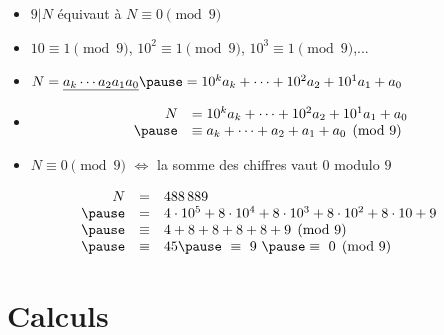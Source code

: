 \begin{frame}

\begin{exemple}

\pause


\pause
\vspace*{-3ex}
\begin{itemize}
  \item $9 | N$ équivaut à $N \equiv 0 \pmod 9$
\pause
  \item $10 \equiv 1 \pmod 9$, \pause $10^2 \equiv 1 \pmod 9$, \pause $10^3 \equiv 1 \pmod 9$,...
\pause
  \item $N = \underline{a_k \cdots a_2 a_1 a_0} 
\pause
= 10^k a_k + \cdots + 10^2 a_2 + 10^1 a_1 + a_0$
\pause
  \item 
\vspace*{-1ex}
$$\begin{array}{rl}
N &=  10^k a_k + \cdots + 10^2 a_2 + 10^1 a_1 + a_0\\
\pause
  &\equiv  a_k + \cdots + a_2 + a_1 + a_0 \pmod 9 \\
\end{array}$$
\vspace*{-2ex}\pause
  \item $N \equiv 0 \pmod 9$ $\iff$ la somme des chiffres vaut $0$ modulo $9$
\end{itemize}

\pause
\vspace*{-1ex}
$$\begin{array}{rcl}
 N &=& 488\, 889 \\
\pause
   &=& 4 \cdot 10^5 + 8 \cdot 10^4 + 8 \cdot 10^3 + 8 \cdot 10^2 + 8 \cdot 10 + 9   \\
\pause
   &\equiv& 4 + 8 + 8 + 8 + 8 + 9 \pmod{9} \\
\pause
   &\equiv& 45 
\pause \ \equiv \ 9 \ 
\pause \equiv \ 0 \pmod{9}\\
\end{array}$$
\end{exemple}
  
\end{frame}

\section{Calculs}


